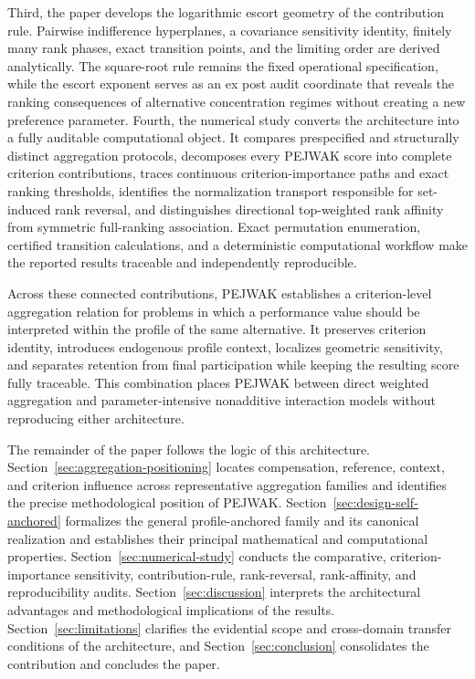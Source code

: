 \documentclass[reqno,11pt]{amsart}
\theoremstyle{definition}
\theoremstyle{plain}
\theoremstyle{remark}
\begin{document}
Third, the paper develops the logarithmic escort geometry of the
contribution rule. Pairwise indifference hyperplanes, a covariance
sensitivity identity, finitely many rank phases, exact transition points,
and the limiting order are derived analytically. The square-root rule
remains the fixed operational specification, while the escort exponent
serves as an ex post audit coordinate that reveals the ranking
consequences of alternative concentration regimes without creating a
new preference parameter. Fourth, the numerical study converts the
architecture into a fully auditable computational object. It compares
prespecified and structurally distinct aggregation protocols, decomposes
every PEJWAK score into complete criterion contributions, traces
continuous criterion-importance paths and exact ranking thresholds,
identifies the normalization transport responsible for set-induced rank
reversal, and distinguishes directional top-weighted rank affinity from
symmetric full-ranking association. Exact permutation enumeration,
certified transition calculations, and a deterministic computational
workflow make the reported results traceable and independently
reproducible.

Across these connected contributions, PEJWAK establishes a
criterion-level aggregation relation for problems in which a performance
value should be interpreted within the profile of the same alternative.
It preserves criterion identity, introduces endogenous profile context,
localizes geometric sensitivity, and separates retention from final
participation while keeping the resulting score fully traceable. This
combination places PEJWAK between direct weighted aggregation and
parameter-intensive nonadditive interaction models without reproducing
either architecture.

The remainder of the paper follows the logic of this architecture.
Section~\ref{sec:aggregation-positioning} locates compensation, reference,
context, and criterion influence across representative aggregation
families and identifies the precise methodological position of PEJWAK.
Section~\ref{sec:design-self-anchored} formalizes the general
profile-anchored family and its canonical realization and establishes
their principal mathematical and computational properties.
Section~\ref{sec:numerical-study} conducts the comparative,
criterion-importance sensitivity, contribution-rule, rank-reversal,
rank-affinity, and reproducibility audits.
Section~\ref{sec:discussion} interprets the architectural advantages and
methodological implications of the results.
Section~\ref{sec:limitations} clarifies the evidential scope and
cross-domain transfer conditions of the architecture, and
Section~\ref{sec:conclusion} consolidates the contribution and concludes
the paper.
\end{document}
